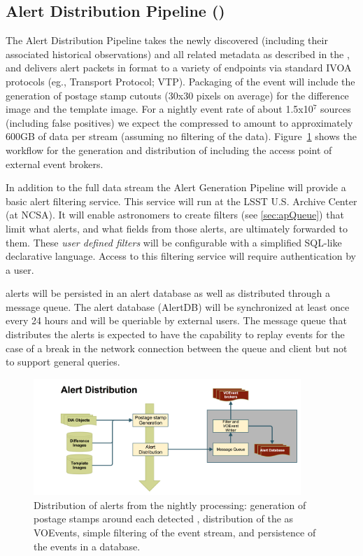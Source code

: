 \clearpage

\subsection{Alert Distribution Pipeline (\wbsAP)}

The Alert Distribution Pipeline takes the newly discovered \DIAObjects (including their associated historical observations) and all related metadata as described in the \DPDD, and delivers alert packets in \VOEvent format to a variety of endpoints via standard IVOA protocols (eg., \VOEvent Transport Protocol; VTP\@). Packaging of the event will include the generation of postage stamp cutouts (30x30 pixels on average) for the difference image and the template image. For a nightly event rate of about 1.5x10$^7$ sources (including false positives) we expect the compressed \VOEvents to amount to approximately 600GB of data per stream (assuming no filtering of the data).  Figure~\ref{fig:apAlertDistribution} shows the workflow for the generation and distribution of \VOEvents including the access point of external event brokers.

In addition to the full data stream the Alert Generation Pipeline will provide a basic alert filtering service. This service will run at the LSST U.S. Archive Center (at NCSA). It will enable astronomers to create filters (see  \ref{sec:apQueue}) that limit what alerts, and what fields from those alerts, are ultimately forwarded to them. These \emph{user defined filters} will be configurable with a simplified SQL-like declarative language. Access to this filtering service will require authentication by a user. 

\VOEvent alerts will be persisted in an alert database as well as distributed through a message queue. The alert database (AlertDB) will be synchronized at least once every 24 hours and will be queriable by external users. The message queue that distributes the alerts is expected to have the capability  to replay events for the case of a break in the network connection between the queue and client but not to support general queries.

\begin{figure}[th]
\begin{center}
\includegraphics[width=0.9\textwidth]{figures/Alert_Distribution.png}
\caption{\label{fig:apAlertDistribution} Distribution of alerts from the nightly processing: generation of postage stamps around each detected \DIASource, distribution of the \DIAObjects as VOEvents, simple filtering of the event stream, and persistence of the events in a database.}
\end{center}
\end{figure} 

